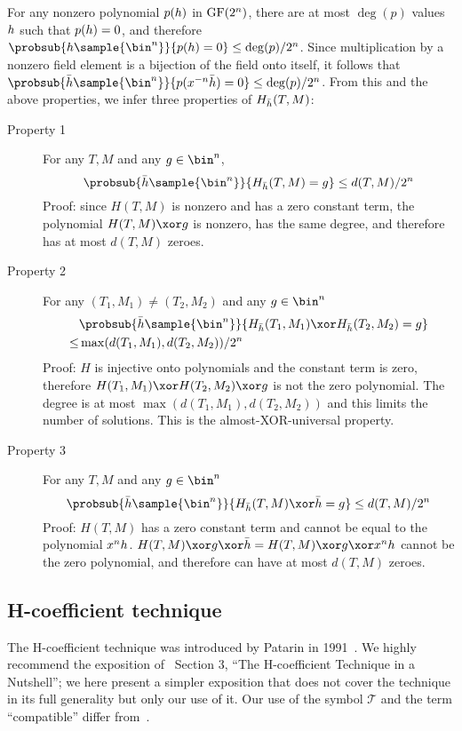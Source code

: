 \documentclass[hctr2.tex]{subfiles}
\begin{document}
For any nonzero polynomial \(p(h)\)
in \(\operatorname{GF}(2^n)\), there are at most \(\deg(p)\) values \(h\)
such that \(p(h) = 0\), and therefore
\(\probsub{\hpoly\sample{\bin^n}}{p(\hpoly) = 0} \leq \deg(p)/2^n\).
Since multiplication by a nonzero field element
is a bijection of the field onto itself, it follows that
\(\probsub{\hgen\sample{\bin^n}}{p(x^{-n}\hgen) = 0} \leq \deg(p)/2^n\).
From this and the above properties,
we infer three properties of \(H_{\bar{h}}(T, M)\):
\begin{description}
    \item[Property 1]
    For any \(T, M\) and any \(g \in \bin^n\),
    \begin{displaymath}
        \probsub{\hgen\sample{\bin^n}}{H_{\hgen}(T, M) = g} \leq d(T, M)/2^n
    \end{displaymath}
    Proof: since \(H(T, M)\) is nonzero and has
    a zero constant term,
    the polynomial \(H(T, M) \xor g\) 
    is nonzero,
    has the same degree,
    and therefore has at most \(d(T, M)\) zeroes.
    \item[Property 2] 
    For any \((T_1, M_1) \neq (T_2, M_2)\) and any \(g \in \bin^n\)
    \begin{align*}
        & \probsub{\hgen\sample{\bin^n}}{H_{\hgen}(T_1, M_1) \xor H_{\hgen}(T_2, M_2) = g} \\
        \leq  & \max(d(T_1, M_1), d(T_2, M_2))/2^n
    \end{align*}
    Proof: \(H\) is injective onto polynomials
    and the constant term is zero, therefore
    \(H(T_1, M_1) \xor H(T_2, M_2) \xor g\)
    is not the zero polynomial.
    The degree is at most \(\max(d(T_1, M_1), d(T_2, M_2))\)
    and this limits the number of solutions.
    This is the almost-XOR-universal property.
    \item[Property 3]
    For any \(T, M\) and any \(g \in \bin^n\)
    \begin{displaymath}
        \probsub{\hgen\sample{\bin^n}}{H_{\hgen}(T, M) \xor \hgen = g} \leq d(T, M)/2^n
    \end{displaymath}
    Proof: \(H(T, M)\) has a zero constant term and
    cannot be equal to the polynomial \(x^nh\).
    \(H(T, M) \xor g \xor \hgen = H(T, M) \xor g \xor x^n\hpoly\)
    cannot be the zero polynomial, and
    therefore can have at most \(d(T, M)\) zeroes.
\end{description}

\subsection{H-coefficient technique}\label{hco}
The H-coefficient technique was introduced by Patarin in 1991~\cite{ppdes,hco}.
We highly recommend the exposition
of~\cite{hco2} Section 3,
``The H-coefficient Technique in a Nutshell'';
we here present a simpler exposition that
does not cover the technique in its full
generality but only our use of it.
Our use of the symbol \(\mathcal{T}\) and the term
``compatible'' differ from~\cite{hco2}.
\end{document}
